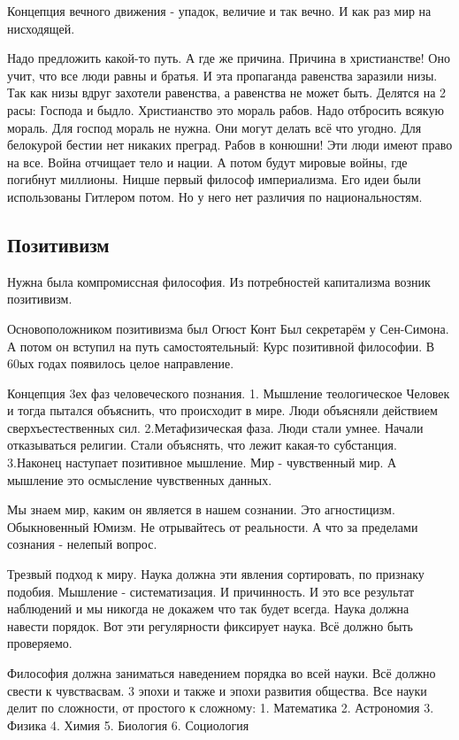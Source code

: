 Концепция вечного движения - упадок, величие и так вечно. И как раз мир на нисходящей.

Надо предложить какой-то путь. А где же причина. Причина в христианстве! Оно учит, что все люди равны и братья. И эта пропаганда равенства заразили низы. Так как низы вдруг захотели равенства, а равенства не может быть. Делятся на 2 расы: Господа и быдло. Христианство это мораль рабов. Надо отбросить всякую мораль. Для господ мораль не нужна. Они могут делать всё что угодно. Для белокурой бестии нет никаких преград. Рабов в конюшни! Эти люди имеют право на все. Война отчищает тело и нации. А потом будут мировые войны, где погибнут миллионы. Ницше первый философ империализма. Его идеи были использованы Гитлером потом. Но у него нет различия по национальностям.
\subsection{Позитивизм}

Нужна была компромиссная философия. Из потребностей капитализма возник позитивизм.

Основоположником позитивизма был Огюст Конт Был секретарём у Сен-Симона. А потом он вступил на путь самостоятельный: Курс позитивной философии. В 60ых годах появилось целое направление.

    Концепция 3ех фаз человеческого познания. 1. Мышление теологическое Человек и тогда пытался объяснить, что происходит в мире. Люди объясняли действием сверхъестественных сил. 2.Метафизическая фаза. Люди стали умнее. Начали отказываться религии. Стали объяснять, что лежит какая-то субстанция. 3.Наконец наступает позитивное мышление. Мир - чувственный мир. А мышление это осмысление чувственных данных.

Мы знаем мир, каким он является в нашем сознании. Это агностицизм. Обыкновенный Юмизм. Не отрывайтесь от реальности. А что за пределами сознания - нелепый вопрос.

    Трезвый подход к миру. Наука должна эти явления сортировать, по признаку подобия. Мышление - систематизация. И причинность. И это все результат наблюдений и мы никогда не докажем что так будет всегда. Наука должна навести порядок. Вот эти регулярности фиксирует наука. Всё должно быть проверяемо.

Философия должна заниматься наведением порядка во всей науки. Всё должно свести к чувствасвам. 3 эпохи и также и эпохи развития общества. Все науки делит по сложности, от простого к сложному: 1. Математика 2. Астрономия 3. Физика 4. Химия 5. Биология 6. Социология

